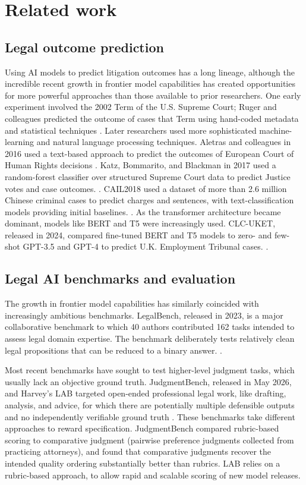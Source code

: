 \documentclass[11pt]{article}
\begin{document}
\section{Related work}


\subsection{Legal outcome prediction}
Using AI models to predict litigation outcomes has a long lineage, although the incredible recent growth in frontier model capabilities has created opportunities for more powerful approaches than those available to prior researchers. One early experiment involved the 2002 Term of the U.S. Supreme Court; Ruger and colleagues predicted the outcome of cases that Term using hand-coded metadata and statistical techniques \citep{ruger}. Later researchers used more sophisticated machine-learning and natural language processing techniques. Aletras and colleagues in 2016 used a text-based approach to predict the outcomes of European Court of Human Rights decisions \citep{aletras}. Katz, Bommarito, and Blackman in 2017 used a random-forest classifier over structured Supreme Court data to predict Justice votes and case outcomes. \citep{katz}. CAIL2018 used a dataset of more than 2.6 million Chinese criminal cases to predict charges and sentences, with text-classification models providing initial baselines. \citep{cail}. As the transformer architecture became dominant, models like BERT and T5 were increasingly used. CLC-UKET, released in 2024, compared fine-tuned BERT and T5 models to zero- and few-shot GPT-3.5 and GPT-4 to predict U.K. Employment Tribunal cases. \citep{clcuket}.

\subsection{Legal AI benchmarks and evaluation}
The growth in frontier model capabilities has similarly coincided with increasingly ambitious benchmarks. LegalBench, released in 2023, is a major collaborative benchmark to which 40 authors contributed 162 tasks intended to assess legal domain expertise. The benchmark deliberately tests relatively clean legal propositions that can be reduced to a binary answer. \citep{legalbench}.

Most recent benchmarks have sought to test higher-level judgment tasks, which usually lack an objective ground truth. JudgmentBench, released in May 2026, and Harvey's LAB targeted open-ended professional legal work, like drafting, analysis, and advice, for which there are potentially multiple defensible outputs and no independently verifiable ground truth \citep{harveyLAB,judgmentbench}. These benchmarks take different approaches to reward specification. JudgmentBench compared rubric-based scoring to comparative judgment (pairwise preference judgments collected from practicing attorneys), and found that comparative judgments recover the intended quality ordering substantially better than rubrics. LAB relies on a rubric-based approach, to allow rapid and scalable scoring of new model releases.
\end{document}
